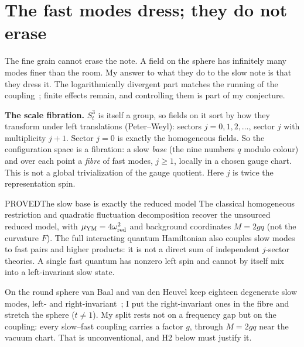 \section{The fast modes dress; they do not erase}

 The fine grain cannot erase the note. A field on the sphere has infinitely many modes finer than the room. My
answer to what they do to the slow note is that they dress it. The logarithmically divergent part matches the running
of the coupling~\cite{GrossWilczek73,Politzer73}; finite effects remain, and controlling them is part of my conjecture.

\textbf{The scale fibration.} $S^3_t$ is itself a group, so fields on it sort by how they transform under left
translations (Peter--Weyl): sectors $j=0,1,2,\dots$, sector $j$ with multiplicity $j+1$. Sector $j=0$ is exactly the
homogeneous fields. So the configuration space is a fibration: a slow \emph{base} (the nine numbers $q$ modulo colour)
and over each point a \emph{fibre} of fast modes, $j\ge1$, locally in a chosen gauge chart. This is not a global
trivialization of the gauge quotient. Here $j$ is twice the representation spin.

\begin{claim}{PROVED}{The slow base is exactly the reduced model}\label{b:pw}
The classical homogeneous restriction and quadratic fluctuation decomposition recover the unsourced reduced
model, with $\mu_{\rm YM}=4\omega^2_{\rm red}$ and background coordinates $M=2gq$ (not the curvature $F$).
The full interacting quantum Hamiltonian also couples slow modes to fast pairs and higher products: it is not a
direct sum of independent $j$-sector theories. A single fast quantum has nonzero left spin and cannot by itself mix
into a left-invariant slow state.
\end{claim}

On the round sphere van Baal and van den Heuvel keep eighteen degenerate slow modes, left- and
right-invariant~\cite{vanBaalvandenHeuvel94,vanBaal00}; I put the right-invariant ones in the fibre and stretch the
sphere ($t\ne1$). My split rests not on a frequency gap but on the coupling: every slow--fast coupling carries a factor
$g$, through $M=2gq$ near the vacuum chart. That is unconventional, and H2 below must justify it.

